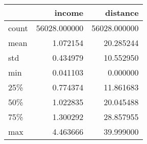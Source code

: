 \begin{tabular}{lrr}
\toprule
{} &        income &      distance \\
\midrule
count &  56028.000000 &  56028.000000 \\
mean  &      1.072154 &     20.285244 \\
std   &      0.434979 &     10.552950 \\
min   &      0.041103 &      0.000000 \\
25\%   &      0.774374 &     11.861683 \\
50\%   &      1.022835 &     20.045488 \\
75\%   &      1.300292 &     28.857955 \\
max   &      4.463666 &     39.999000 \\
\bottomrule
\end{tabular}
